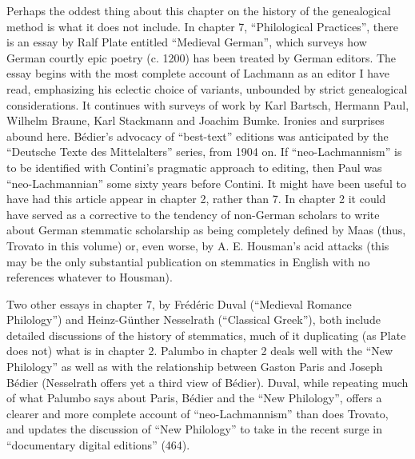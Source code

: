 \begin{review}
Perhaps the oddest thing about this chapter on the history of
the genealogical method is what it does not include. In chapter 7,
``Philological Practices'', there is an essay by Ralf Plate entitled
``Medieval German'', which surveys how German courtly epic poetry (c.
1200) has been treated by German editors. The essay begins with the most
complete account of Lachmann as an editor I have read, emphasizing his
eclectic choice of variants, unbounded by strict genealogical
considerations. It continues with surveys of work by Karl Bartsch,
Hermann Paul, Wilhelm Braune, Karl Stackmann and Joachim Bumke. Ironies
and surprises abound here. Bédier's advocacy of ``best-text'' editions
was anticipated by the ``Deutsche Texte des Mittelalters'' series, from
1904 on. If ``neo-Lachmannism'' is to be identified with Contini's
pragmatic approach to editing, then Paul was ``neo-Lachmannian'' some
sixty years before Contini. It might have been useful to have had this
article appear in chapter 2, rather than 7. In chapter 2 it could have
served as a corrective to the tendency of non-German scholars to write
about German stemmatic scholarship as being completely defined by Maas
(thus, Trovato in this volume) or, even worse, by A. E. Housman's acid
attacks (this may be the only substantial publication on stemmatics in
English with no references whatever to Housman).

Two other essays in chapter 7, by Frédéric Duval (``Medieval
Romance Philology'') and Heinz-Günther Nesselrath (``Classical Greek''),
both include detailed discussions of the history of stemmatics, much of
it duplicating (as Plate does not) what is in chapter 2. Palumbo in
chapter 2 deals well with the ``New Philology'' as well as with the
relationship between Gaston Paris and Joseph Bédier (Nesselrath offers
yet a third view of Bédier). Duval, while repeating much of what Palumbo
says about Paris, Bédier and the ``New Philology'', offers a clearer and
more complete account of ``neo-Lachmannism'' than does Trovato, and
updates the discussion of ``New Philology'' to take in the recent surge
in ``documentary digital editions'' (464).


\end{review}
